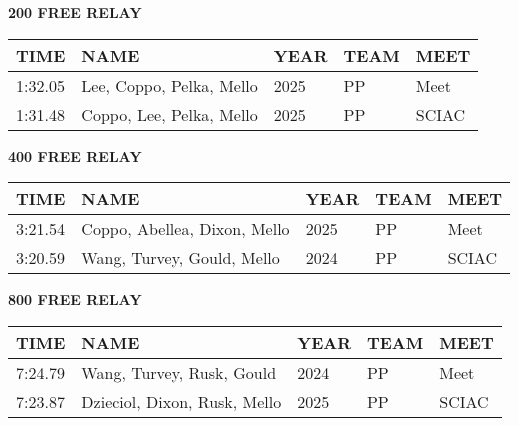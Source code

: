 \vspace{0.4cm}

\begin{center}
\begin{minipage}[t]{0.7\textwidth}
\centering
\textbf{200 FREE RELAY}\\[0.05cm]
\begin{tabular}{@{}p{1.8cm}p{2.8cm}p{1.2cm}p{1.4cm}p{1.4cm}@{}}
\hline
\textbf{TIME} & \textbf{NAME} & \textbf{YEAR} & \textbf{TEAM} & \textbf{MEET} \\
\hline
1:32.05 & Lee, Coppo, Pelka, Mello & 2025 & PP & Meet \\
1:31.48 & Coppo, Lee, Pelka, Mello & 2025 & PP & SCIAC \\
\hline
\end{tabular}
\end{minipage}
\end{center}

\vspace{0.4cm}

\begin{center}
\begin{minipage}[t]{0.7\textwidth}
\centering
\textbf{400 FREE RELAY}\\[0.05cm]
\begin{tabular}{@{}p{1.8cm}p{2.8cm}p{1.2cm}p{1.4cm}p{1.4cm}@{}}
\hline
\textbf{TIME} & \textbf{NAME} & \textbf{YEAR} & \textbf{TEAM} & \textbf{MEET} \\
\hline
3:21.54 & Coppo, Abellea, Dixon, Mello & 2025 & PP & Meet \\
3:20.59 & Wang, Turvey, Gould, Mello & 2024 & PP & SCIAC \\
\hline
\end{tabular}
\end{minipage}
\end{center}

\vspace{0.4cm}

\begin{center}
\begin{minipage}[t]{0.7\textwidth}
\centering
\textbf{800 FREE RELAY}\\[0.05cm]
\begin{tabular}{@{}p{1.8cm}p{2.8cm}p{1.2cm}p{1.4cm}p{1.4cm}@{}}
\hline
\textbf{TIME} & \textbf{NAME} & \textbf{YEAR} & \textbf{TEAM} & \textbf{MEET} \\
\hline
7:24.79 & Wang, Turvey, Rusk, Gould & 2024 & PP & Meet \\
7:23.87 & Dzieciol, Dixon, Rusk, Mello & 2025 & PP & SCIAC \\
\hline
\end{tabular}
\end{minipage}
\end{center}

